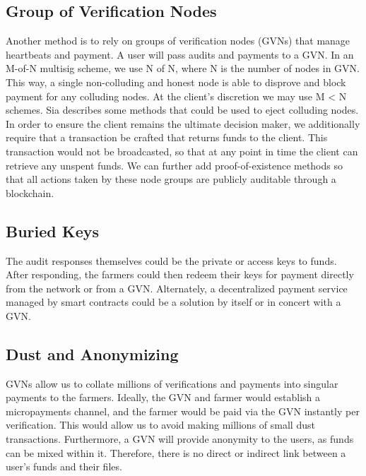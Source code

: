 \documentclass[a4paper,10pt]{article}
\begin{document}
\subsection{Group of Verification Nodes}
Another method is to rely on groups of verification nodes (GVNs) that manage heartbeats and payment. A user will pass audits and payments to a GVN. In an M-of-N multisig scheme, we use N of N, where N is the number of nodes in GVN. This way, a single non-colluding and honest node is able to disprove and block payment for any colluding nodes. At the client’s discretion we may use M < N schemes. Sia \cite{20} describes some methods that could be used to eject colluding nodes. In order to ensure the client remains the ultimate decision maker, we additionally require that a transaction be crafted that returns funds to the client. This transaction would not be broadcasted, so that at any point in time the client can retrieve any unspent funds. We can further add proof-of-existence methods \cite{4} \cite{5} \cite{7} so that all actions taken by these node groups are publicly auditable through a blockchain. 

\subsection{Buried Keys}
The audit responses themselves could be the private or access keys to funds. After responding, the farmers could then redeem their keys for payment directly from the network or from a GVN. Alternately, a decentralized payment service managed by smart contracts could be a solution by itself or in concert with a GVN. 

\subsection{Dust and Anonymizing}
GVNs allow us to collate millions of verifications and payments into singular payments to the farmers. Ideally, the GVN and farmer would establish a micropayments channel, and the farmer would be paid via the GVN instantly per verification. This would allow us to avoid making millions of small dust transactions. Furthermore, a GVN will provide anonymity to the users, as funds can be mixed within it. Therefore, there is no direct or indirect link between a user’s funds and their files.
\end{document}
